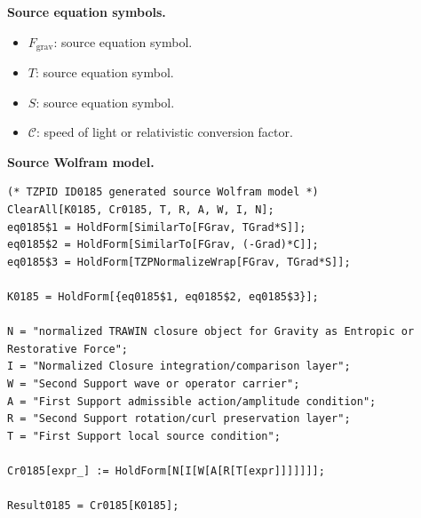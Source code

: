\begin{minipage}[t]{0.49\linewidth}
\begingroup
\small
\raggedright
\textbf{Source equation symbols.}\par
\begin{itemize}[leftmargin=1.35em,itemsep=1pt,topsep=1pt,parsep=0pt]
    \item $F_{\mathrm{grav}}$: source equation symbol.
    \item $T$: source equation symbol.
    \item $S$: source equation symbol.
    \item $\mathcal{C}$: speed of light or relativistic conversion factor.
\end{itemize}
\endgroup
\end{minipage}\hfill
\begin{minipage}[t]{0.47\linewidth}
\begingroup
\scriptsize
\raggedright
\textbf{Source Wolfram model.}\par
\begin{Verbatim}[fontsize=\tiny,breaklines=true,breakanywhere=true]
(* TZPID ID0185 generated source Wolfram model *)
ClearAll[K0185, Cr0185, T, R, A, W, I, N];
eq0185$1 = HoldForm[SimilarTo[FGrav, TGrad*S]];
eq0185$2 = HoldForm[SimilarTo[FGrav, (-Grad)*C]];
eq0185$3 = HoldForm[TZPNormalizeWrap[FGrav, TGrad*S]];

K0185 = HoldForm[{eq0185$1, eq0185$2, eq0185$3}];

N = "normalized TRAWIN closure object for Gravity as Entropic or Restorative Force";
I = "Normalized Closure integration/comparison layer";
W = "Second Support wave or operator carrier";
A = "First Support admissible action/amplitude condition";
R = "Second Support rotation/curl preservation layer";
T = "First Support local source condition";

Cr0185[expr_] := HoldForm[N[I[W[A[R[T[expr]]]]]]];

Result0185 = Cr0185[K0185];
\end{Verbatim}
\endgroup
\end{minipage}

